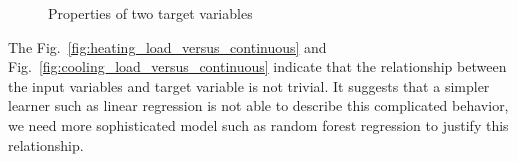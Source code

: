 \documentclass{article}
\begin{document}
\begin{figure}[!bht]
\centering     \captionsetup{font=footnotesize, width=.6\textwidth}
{}
\caption{Properties of two target variables} 
\end{figure}

The Fig.~\ref{fig:heating_load_versus_continuous} and Fig.~\ref{fig:cooling_load_versus_continuous} indicate that the relationship between the input variables and target variable is not trivial. It suggests that a simpler learner such as linear regression is not able to describe this complicated behavior, we need more sophisticated model such as random forest regression to justify this relationship.
\end{document}
